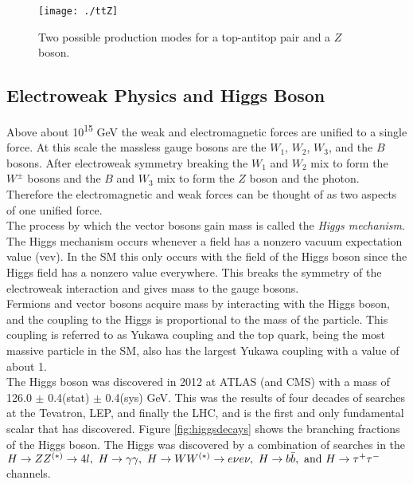 \begin{figure}[h!]
  \centering
	\texttt{[image: ./ttZ]}
\caption[$t\bar{t}+Z$ production]{\label{fig:ttz}{ Two possible production modes for a top-antitop pair and a $Z$ boson. }} 
\end{figure}
	
	

\subsection{Electroweak Physics and Higgs Boson} %

	Above about 10\textsuperscript{15} GeV the weak and electromagnetic forces are unified to a single force.  At this scale the massless gauge bosons are the $W_{1}$, $W_{2}$, $W_{3}$, and the $B$ bosons.  After electroweak symmetry breaking the $W_{1}$ and $W_{2}$ mix to form the $W^{\pm}$ bosons and the $B$ and $W_{3}$ mix to form the $Z$ boson and the photon.  Therefore the electromagnetic and weak forces can be thought of as two aspects of one unified force.  \\
	
	The process by which the vector bosons gain mass is called the \textit{Higgs mechanism}.  The Higgs mechanism occurs whenever a field has a nonzero vacuum expectation value (vev).  In the SM this only occurs with the field of the Higgs boson since the Higgs field has a nonzero value everywhere.  This breaks the symmetry of the electroweak interaction and gives mass to the gauge bosons.\\%
		
		Fermions and vector bosons acquire mass by interacting with the Higgs boson, and the coupling to the Higgs is proportional to the mass of the particle.  This coupling is referred to as Yukawa coupling and the top quark, being the most massive particle in the SM, also has the largest Yukawa coupling with a value of about 1. \\
		
		The Higgs boson was discovered in 2012 at ATLAS\cite{HiggsAtlas} (and CMS\cite{cmshiggsdiscovery}) with a mass of 126.0 $\pm$ 0.4(stat) $\pm$ 0.4(sys) GeV\cite{HiggsAtlas}. This was the results of four decades of searches at the Tevatron, LEP, and finally the LHC, and is the first and only fundamental scalar that has discovered.  Figure \ref{fig:higgsdecays} shows the branching fractions of the Higgs boson.  The Higgs was discovered by a combination of searches in the $H \rightarrow ZZ^{(*)} \rightarrow 4l,\ H \rightarrow \gamma\gamma, \ H \rightarrow WW^{(*)} \rightarrow e \nu e \nu, \ H \rightarrow b\bar{b},\ \mathrm{and}\ H \rightarrow \tau^{+}\tau^{-}$ channels. \\
		
